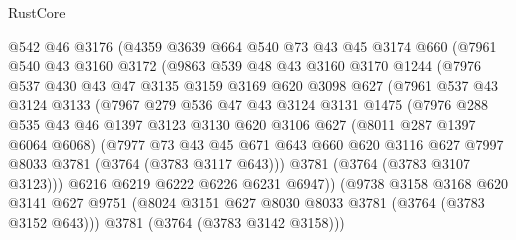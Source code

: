 \begin{lexlean}{RustCore}
\begin{coremodule}
            @542
            @46
            @3176
            (@4359
              @3639
              @664
              @540
              @73
              @43
              @45
              @3174
              @660
              (@7961
                @540
                @43
                @3160
                @3172
                (@9863
                  @539
                  @48
                  @43
                  @3160
                  @3170
                  @1244
                  (@7976
                    @537
                    @430
                    @43
                    @47
                    @3135
                    @3159
                    @3169
                    @620
                    @3098
                    @627
                    (@7961
                      @537
                      @43
                      @3124
                      @3133
                      (@7967
                        @279
                        @536
                        @47
                        @43
                        @3124
                        @3131
                        @1475
                        (@7976
                          @288
                          @535
                          @43
                          @46
                          @1397
                          @3123
                          @3130
                          @620
                          @3106
                          @627
                          (@8011 @287 @1397 @6064 @6068)
                          (@7977
                            @73
                            @43
                            @45
                            @671
                            @643
                            @660
                            @620
                            @3116
                            @627
                            @7997
                            @8033
                            @3781
                            (@3764 (@3783 @3117 @643)))
                          @3781
                          (@3764 (@3783 @3107 @3123)))
                        @6216
                        @6219
                        @6222
                        @6226
                        @6231
                        @6947))
                    (@9738
                      @3158
                      @3168
                      @620
                      @3141
                      @627
                      @9751
                      (@8024 @3151 @627 @8030 @8033 @3781 (@3764 (@3783 @3152 @643)))
                      @3781
                      (@3764 (@3783 @3142 @3158)))

\end{coremodule}
\end{lexlean}
